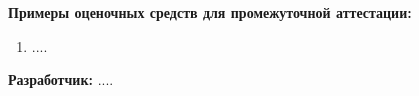 \documentclass[12pt]{scrartcl}
\newcommand{\rdf}[2]{#2}
\newenvironment{rdfctx}[1]{}{}
\renewcommand{\paragraph}[1]{\par\textbf{#1}}
\begin{document}
\paragraph{Примеры оценочных средств для промежуточной аттестации:}


\begin{rdfctx}{\rdfsetctx{list}{syll wpdd:itemList !wpdd:ExampleList !wpdd:IntermediateAttestation !wpdd:ItemList}}
\begin{enumerate}
\item \rdf{list ^schema:member !wpdd:ListItem !wpdd:Example}{....}
\end{enumerate}
\end{rdfctx}
\vspace{1em}
\vfill
\paragraph{\normalfont Разработчик:}%
\rdf{syll wpdd:courseDC schema:author {foaf:name rdf:label} !foaf:Person !wpdd:Author}{....} %

\end{document}
